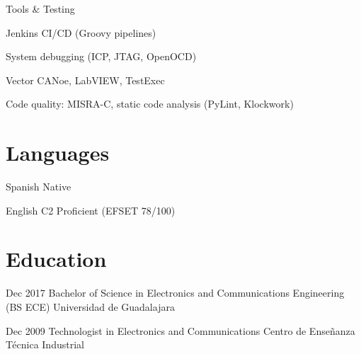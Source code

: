 \documentclass{resume} %
\begin{document}
\skillgroup
    {Tools & Testing}
    {
    \begin{itemize-bullets}
        \item{Jenkins CI/CD (Groovy pipelines)}
        \item{System debugging (ICP, JTAG, OpenOCD)}
        \item{Vector CANoe, LabVIEW, TestExec}
        \item{Code quality: MISRA-C, static code analysis (PyLint, Klockwork)}
        \end{itemize-bullets}
    }




\section{Languages}


\langitem
    {Spanish}
    {Native}


\langitem
    {English}
    {C2 Proficient (EFSET 78/100)}




\section{Education}


\eduitem
    {Dec 2017}
    {Bachelor of Science in Electronics and Communications Engineering (BS ECE)}
    {Universidad de Guadalajara}


\eduitem
    {Dec 2009}
    {Technologist in Electronics and Communications}
    {Centro de Enseñanza Técnica Industrial}


\end{document}
